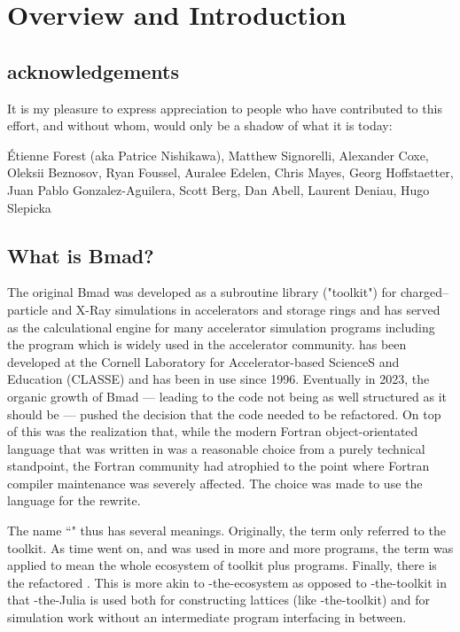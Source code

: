 \chapter{Overview and Introduction}

\section{acknowledgements}

It is my pleasure to express appreciation to people who have contributed to this effort, and without
whom, \bmadjl would only be a shadow of what it is today: 

\'Etienne Forest (aka Patrice Nishikawa),
Matthew Signorelli,
Alexander Coxe,
Oleksii Beznosov,
Ryan Foussel,
Auralee Edelen,
Chris Mayes,
Georg Hoffstaetter,
Juan Pablo Gonzalez-Aguilera,
Scott Berg,
Dan Abell,
Laurent Deniau,
Hugo Slepicka



\section{What is Bmad?}

The original Bmad was developed as a subroutine
library ("toolkit") for charged--particle and X-Ray simulations in accelerators and storage rings and 
has served as the calculational engine
for many accelerator simulation programs including the \tao program which is widely used in the
accelerator community. \bmad has
been developed at the Cornell Laboratory for Accelerator-based ScienceS and Education (CLASSE) and
has been in use since 1996.
Eventually in 2023, the organic growth of Bmad --- leading to the code not being as well structured
as it should be --- pushed the decision that the code needed to be
refactored. On top of this was the realization that, while the modern Fortran object-orientated
language that \bmad was written in was a reasonable choice from a purely technical standpoint, 
the Fortran community had atrophied to the point where Fortran compiler maintenance was severely 
affected. The choice was made to use the \julia language for the rewrite.

The name ``\bmad" thus has several meanings. Originally, the term only referred to the \bmad
toolkit. As time went on, and \bmad was used in more and more programs, the term \bmad was
applied to mean the whole ecosystem of toolkit plus programs. Finally, there is the refactored \julia
\bmad. This \bmad is more akin to \bmad-the-ecosystem as
opposed to \bmad-the-toolkit in that \bmad-the-Julia is used both for constructing lattices
(like \bmad-the-toolkit) and for simulation work without an intermediate program interfacing in between.

